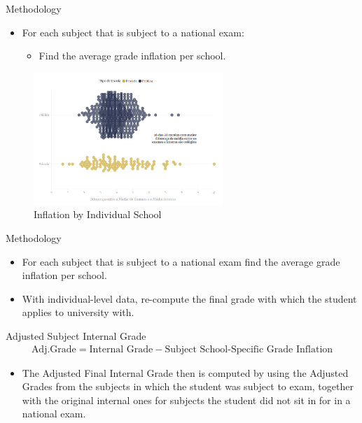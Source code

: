 \documentclass{beamer}
\begin{document}
\begin{frame}{Methodology}
  \begin{itemize}
    \item For each subject that is subject to a national exam:
    \begin{itemize}
        \item Find the average grade inflation per school.
    \end{itemize}
  \end{itemize}
  \begin{figure}[ht]
  \centering
  \includegraphics[height=5cm, keepaspectratio]{Figures/InflationBySchool.png}
  \caption{Inflation by Individual School}
  \label{fig: InflationBySchool}
\end{figure}
\end{frame}

\begin{frame}{Methodology}
    \begin{itemize}
    \item For each subject that is subject to a national exam find the average grade inflation per school.
    \item With individual-level data, re-compute the final grade with which the student applies to university with.
\end{itemize}


  \begin{block}{Adjusted Subject Internal Grade}
  \begin{align}
\text{Adj.Grade} = \text{Internal Grade} -\text{Subject School-Specific Grade Inflation}
  \end{align}
  \end{block}
  

\begin{itemize}
    \item The Adjusted Final Internal Grade then is computed by using the Adjusted Grades from the subjects in which the student was subject to exam, together with the original internal ones for subjects the student did not sit in for in a national exam.
\end{itemize}

\end{frame}
\end{document}
